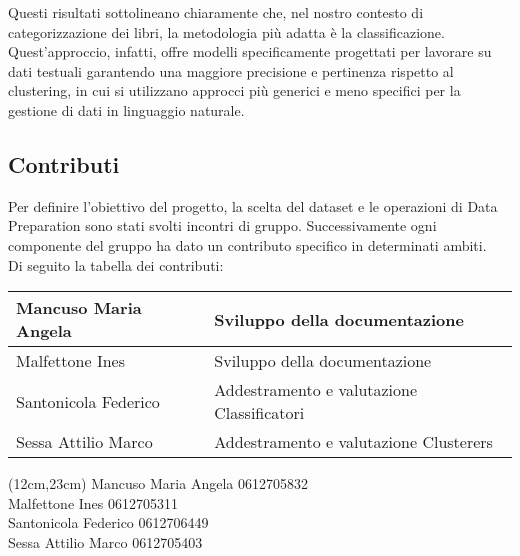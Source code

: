 \documentclass[12pt,oneside]{article}
\begin{document}
        \begin{justify}
        Questi risultati sottolineano chiaramente che, nel nostro contesto di categorizzazione dei libri, la metodologia più adatta è la classificazione. Quest’approccio, infatti, offre modelli specificamente progettati per lavorare su dati testuali garantendo una maggiore precisione e pertinenza rispetto al clustering, in cui si utilizzano approcci più generici e meno specifici per la gestione di dati in linguaggio naturale. 
    \end{justify}
    

\newpage
\begin{enumerate}
    \section{Contributi}
    \begin{justify}
    Per definire l'obiettivo del progetto, la scelta del dataset e le operazioni di Data Preparation sono stati svolti incontri di gruppo. Successivamente ogni componente del gruppo ha dato un contributo specifico in determinati ambiti.\\
    Di seguito la tabella dei contributi:
    \end{justify}
    
    \begin{tabular}{ | p{4.5cm} | p{9cm} | }
    \hline
    Mancuso Maria Angela & Sviluppo della documentazione\\
    \hline
    Malfettone Ines & Sviluppo della documentazione\\
    \hline
    Santonicola Federico & Addestramento e valutazione Classificatori\\
    \hline
    Sessa Attilio Marco & Addestramento e valutazione Clusterers\\
    \hline
    \end{tabular}
\end{enumerate}



\begin{textblock*}{8cm}(12cm,23cm)
    Mancuso Maria Angela 0612705832\\
    Malfettone Ines 0612705311\\
    Santonicola Federico 0612706449\\
    Sessa Attilio Marco 0612705403
\end{textblock*}
\end{document}
